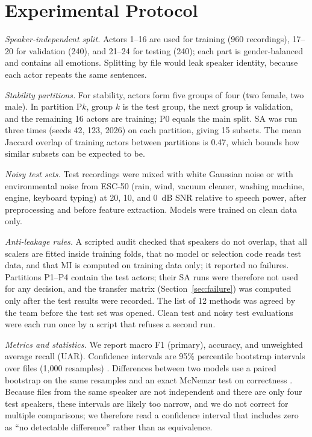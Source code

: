 \documentclass[conference]{IEEEtran}
\begin{document}
\section{Experimental Protocol}

\emph{Speaker-independent split.} Actors 1--16 are used for training (960 recordings), 17--20
for validation (240), and 21--24 for testing (240); each part is gender-balanced and contains all
emotions. Splitting by file would leak speaker identity, because each actor repeats the same
sentences.

\emph{Stability partitions.} For stability, actors form five groups of four (two female, two
male). In partition P$k$, group $k$ is the test group, the next group is validation, and the
remaining 16 actors are training; P0 equals the main split. SA was run three times (seeds 42,
123, 2026) on each partition, giving 15 subsets. The mean Jaccard overlap of training actors
between partitions is 0.47, which bounds how similar subsets can be expected to be.

\emph{Noisy test sets.} Test recordings were mixed with white Gaussian noise or with
environmental noise from ESC-50 \cite{piczak2015esc} (rain, wind, vacuum cleaner, washing
machine, engine, keyboard typing) at 20, 10, and 0~dB SNR relative to speech power, after
preprocessing and before feature extraction. Models were trained on clean data only.

\emph{Anti-leakage rules.} A scripted audit checked that speakers do not overlap, that all
scalers are fitted inside training folds, that no model or selection code reads test data, and
that MI is computed on training data only; it reported no failures. Partitions P1--P4 contain the
test actors; their SA runs were therefore not used for any decision, and the transfer matrix
(Section~\ref{sec:failure}) was computed only after the test results were recorded. The list of
12 methods was agreed by the team before the test set was opened. Clean test and noisy test
evaluations were each run once by a script that refuses a second run.

\emph{Metrics and statistics.} We report macro F1 (primary), accuracy, and unweighted average
recall (UAR). Confidence intervals are 95\% percentile bootstrap intervals over files (1{,}000
resamples) \cite{efron1993bootstrap}. Differences between two models use a paired bootstrap on
the same resamples and an exact McNemar test on correctness \cite{dietterich1998tests}. Because
files from the same speaker are not independent and there are only four test speakers, these
intervals are likely too narrow, and we do not correct for multiple comparisons; we therefore
read a confidence interval that includes zero as ``no detectable difference'' rather than as
equivalence.
\end{document}
